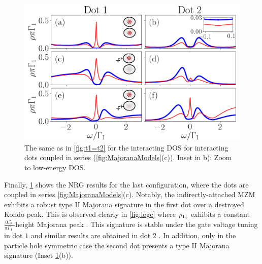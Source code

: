 




\begin{figure}[bt]
    \begin{center}
    \includegraphics[scale=0.41]{IMAGES/NRG/t2>0.png}
    \caption{  \label{fig:Nt2>0} The same as in \ref{fig:t1=t2} for the  interacting DOS for interacting dots coupled in series (\ref{fig:MajoranaModels}(c)). Inset in b): Zoom to low-energy DOS. \protect\Source{}
    }
    \end{center}
    \end{figure}



    Finally, \ref{fig:Nt2>0} shows the NRG results for the last configuration, where the dots are coupled in series \ref{fig:MajoranaModels}(c). Notably, the indirectly-attached MZM exhibits a robust type II Majorana signature in the first dot over a destroyed Kondo peak. This is observed clearly in  \ref{fig:logc} where $\rho_{1\downarrow}$ exhibits a constant $\frac{0.5}{\pi \Gamma_1}$-height Majorana peak  . This signature is stable under the gate voltage tuning in dot $1$ and similar results are obtained in dot $2$ . In addition, only  in the particle hole symmetric case the second dot presents a type II Majorana signature (Inset \ref{fig:Nt2>0}(b)). 


